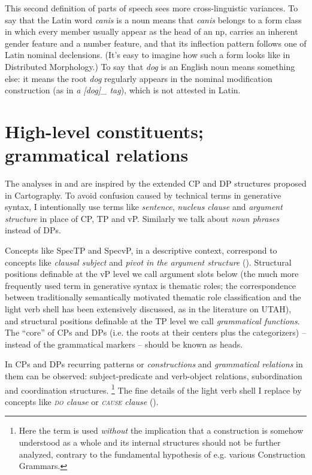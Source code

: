 \documentclass[UTF8, a4paper, oneside, scheme=plain, 12pt]{ctexrep}
\newcommand*{\term}[1]{\emph{#1}}
\newcommand{\form}[1]{\emph{#1}}
\newcommand*{\category}[1]{\textsc{#1}}
\begin{document}
{This second definition of parts of speech sees more cross-linguistic variances.
To say that the Latin word \form{canis} is a noun
means that \form{canis} belongs to a form class in which every member  
usually appear as the head of an \ac{np},
carries an inherent gender feature and a number feature,
and that its inflection pattern follows one of Latin nominal declensions.
(It's easy to imagine how such a form looks like in Distributed Morphology.)
To say that \form{dog} is an English noun means something else:
it means the root \form{dog} regularly appears in the nominal modification construction (as in \form{a [dog]_{} tag}),
which is not attested in Latin.

\section{High-level constituents; grammatical relations}

The analyses in  and  are inspired by the extended CP and DP structures proposed in Cartography.
To avoid confusion caused by technical terms in generative syntax,
I intentionally use terms like \term{sentence}, \term{nucleus clause} and \term{argument structure} in place of CP, TP and vP.
Similarly we talk about \term{noun phrases} instead of DPs.

Concepts like SpecTP and SpecvP, in a descriptive context, correspond to concepts like \term{clausal subject} and \term{pivot in the argument structure} ().
Structural positions definable at the vP level we call argument slots below
(the much more frequently used term in generative syntax is thematic roles; the correspondence between traditionally semantically motivated thematic role classification and the light verb shell has been extensively discussed, as in the literature on UTAH),
and structural positions definable at the TP level we call \term{grammatical functions}.
The ``core'' of CPs and DPs (i.e. the roots at their centers plus the categorizers) -- instead of the grammatical markers -- should be known as heads. 

In CPs and DPs recurring patterns or \term{constructions} and \term{grammatical relations} in them can be observed:
subject-predicate and verb-object relations,
subordination and coordination structures.%
\footnote{
    Here the term is used \emph{without} the implication 
    that a construction is somehow understood as a whole 
    and its internal structures should not be further analyzed,
    contrary to the fundamental hypothesis of e.g. various Construction Grammars.
}
The fine details of the light verb shell I replace by concepts like \term{\category{do} clause} or \term{\category{cause} clause} ().

}
\end{document}
